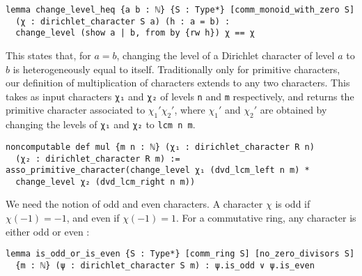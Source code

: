 \documentclass[a4paper,UKenglish,cleveref, autoref, thm-restate]{lipics-v2021}
\newcommand{\lean}[1]{\texttt{#1}\xspace} %
\begin{document}
\begin{lstlisting}
lemma change_level_heq {a b : ℕ} {S : Type*} [comm_monoid_with_zero S] 
  (χ : dirichlet_character S a) (h : a = b) : 
  change_level (show a | b, from by {rw h}) χ == χ
\end{lstlisting}
This states that, for $a = b$, changing the level of a Dirichlet character of level $a$ to $b$ is heterogeneously equal to itself. \newline
Traditionally only for primitive characters, our definition of multiplication of characters 
extends to any two characters. This takes as input characters \lean{χ₁} and \lean{χ₂} of levels \lean{n} and \lean{m} respectively, and returns the primitive 
character associated to $\chi_1' \chi_2'$, where $\chi_1'$ and $\chi_2'$ are obtained by changing the levels 
of \lean{χ₁} and \lean{χ₂} to \lean{lcm n m}. 
\begin{lstlisting}
noncomputable def mul {m n : ℕ} (χ₁ : dirichlet_character R n) 
  (χ₂ : dirichlet_character R m) :=
asso_primitive_character(change_level χ₁ (dvd_lcm_left n m) * 
  change_level χ₂ (dvd_lcm_right n m))
\end{lstlisting} 
We need the notion of odd and even characters. A character $\chi$ is odd if $\chi (-1) = -1$, and 
even if $\chi (-1) = 1$. For a commutative ring, any character is either odd or even : 
\begin{lstlisting}
lemma is_odd_or_is_even {S : Type*} [comm_ring S] [no_zero_divisors S] 
  {m : ℕ} (ψ : dirichlet_character S m) : ψ.is_odd ∨ ψ.is_even
\end{lstlisting}
\end{document}
